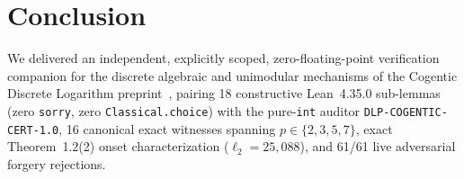 \documentclass[10pt,twocolumn]{article}
\begin{document}
\section{Conclusion}\label{sec:conc}
We delivered an independent, explicitly scoped, zero-floating-point verification companion for the discrete algebraic and unimodular mechanisms of the Cogentic Discrete Logarithm preprint~\cite{cogentic2026dlp,cai2026cogentic}, pairing 18 constructive Lean~4.35.0 sub-lemmas (zero \texttt{sorry}, zero \texttt{Classical.choice}) with the pure-\texttt{int} auditor \nolinkurl{DLP-COGENTIC-CERT-1.0}, 16 canonical exact witnesses spanning $p\in\{2,3,5,7\}$, exact Theorem~1.2(2) onset characterization ($\ell_2=25{,}088$), and 61/61 live adversarial forgery rejections.

{\footnotesize

}
\end{document}
